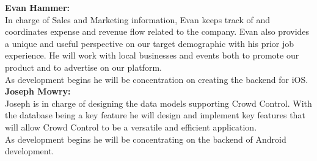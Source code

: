 \noindent
\textbf{Evan Hammer:}\\ In charge of Sales and Marketing information, Evan keeps track of and coordinates expense and revenue flow related to the company. Evan also provides a unique and useful perspective on our target demographic with his prior job experience. He will work with local businesses and events both to promote our product and to advertise on our platform.\\
 As development begins he will be concentration on creating the backend for iOS. \\
 
\noindent
\textbf{Joseph Mowry:}\\ Joseph is in charge of designing the data models supporting Crowd Control. With the database being a key feature he will design and implement key features that will allow Crowd Control to be a versatile and efficient application.\\
 As development begins he will be concentrating on the backend of Android development.\\

